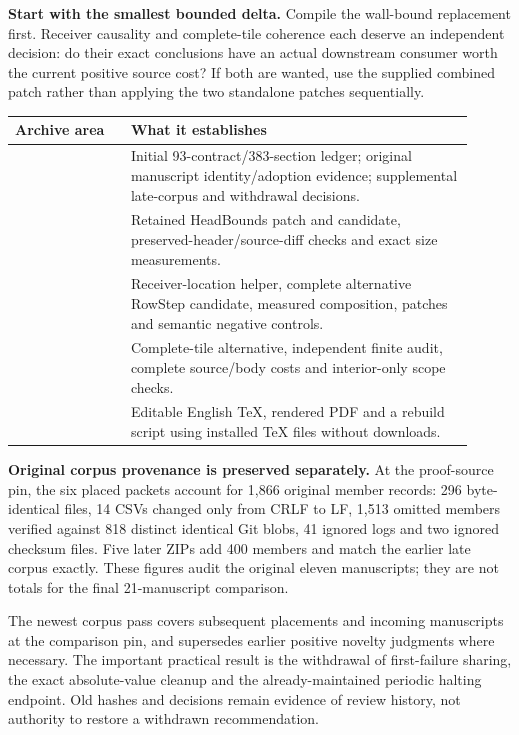 \textbf{Start with the smallest bounded delta.} Compile the wall-bound replacement first. Receiver causality and complete-tile coherence each deserve an independent decision: do their exact conclusions have an actual downstream consumer worth the current positive source cost? If both are wanted, use the supplied combined patch rather than applying the two standalone patches sequentially.

\begin{tabular}{@{}L{0.23\linewidth}L{0.68\linewidth}@{}}\toprule
Archive area & What it establishes\\\midrule
{} & Initial 93-contract/383-section ledger; original manuscript identity/adoption evidence; supplemental late-corpus and withdrawal decisions.\\[5pt]
 & Retained HeadBounds patch and candidate, preserved-header/source-diff checks and exact size measurements.\\[5pt]
 & Receiver-location helper, complete alternative RowStep candidate, measured composition, patches and semantic negative controls.\\[5pt]
 & Complete-tile alternative, independent finite audit, complete source/body costs and interior-only scope checks.\\[5pt]
 & Editable English TeX, rendered PDF and a rebuild script using installed TeX files without downloads.\\\bottomrule
\end{tabular}

\textbf{Original corpus provenance is preserved separately.} At the proof-source pin, the six placed packets account for 1,866 original member records: 296 byte-identical files, 14 CSVs changed only from CRLF to LF, 1,513 omitted members verified against 818 distinct identical Git blobs, 41 ignored logs and two ignored checksum files. Five later ZIPs add 400 members and match the earlier late corpus exactly. These figures audit the original eleven manuscripts; they are not totals for the final 21-manuscript comparison.

The newest corpus pass covers subsequent placements and incoming manuscripts at the comparison pin, and supersedes earlier positive novelty judgments where necessary. The important practical result is the withdrawal of first-failure sharing, the exact absolute-value cleanup and the already-maintained periodic halting endpoint. Old hashes and decisions remain evidence of review history, not authority to restore a withdrawn recommendation.

